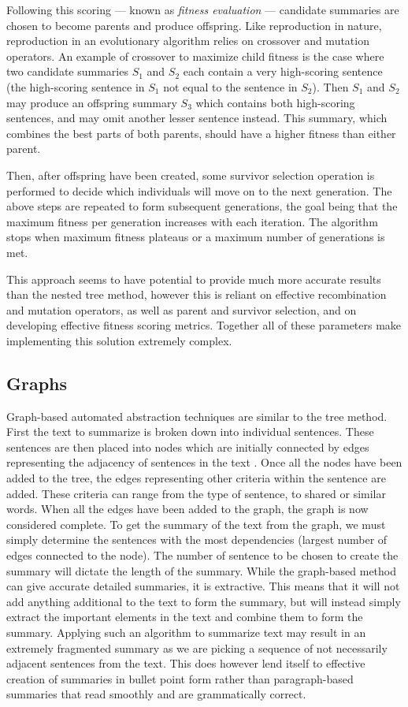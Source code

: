 Following this scoring --- known as {\em fitness evaluation} --- candidate summaries are chosen to become parents and produce offspring. Like reproduction in nature, reproduction in an evolutionary algorithm relies on crossover and mutation operators. An example of crossover to maximize child fitness is the case where two candidate summaries $S_1$ and $S_2$ each contain a very high-scoring sentence (the high-scoring sentence in $S_1$ not equal to the sentence in $S_2$). Then $S_1$ and $S_2$ may produce an offspring summary $S_3$ which contains both high-scoring sentences, and may omit another lesser sentence instead. This summary, which combines the best parts of both parents, should have a higher fitness than either parent.

Then, after offspring have been created, some survivor selection operation is performed to decide which individuals will move on to the next generation. The above steps are repeated to form subsequent generations, the goal being that the maximum fitness per generation increases with each iteration. The algorithm stops when maximum fitness plateaus or a maximum number of generations is met.

This approach seems to have potential to provide much more accurate results than the nested tree method, however this is reliant on effective recombination and mutation operators, as well as parent and survivor selection, and on developing effective fitness scoring metrics. Together all of these parameters make implementing this solution extremely complex.


\subsection{Graphs}
Graph-based automated abstraction techniques are similar to the tree method. First the text to summarize is broken down into individual sentences. These sentences are then placed into nodes which are initially connected by edges representing the adjacency of sentences in the text \cite{art4}. Once all the nodes have been added to the tree, the edges representing other criteria within the sentence are added. These criteria can range from the type of sentence, to shared or similar words. When all the edges have been added to the graph, the graph is now considered complete. To get the summary of the text from the graph, we must simply determine the sentences with the most dependencies (\ie largest number of edges connected to the node). The number of sentence to be chosen to create the summary will dictate the length of the summary. While the graph-based method can give accurate detailed summaries, it is extractive. This means that it will not add anything additional to the text to form the summary, but will instead simply extract the important elements in the text and combine them to form the summary.
Applying such an algorithm to summarize text may result in an extremely fragmented summary as we are picking a sequence of not necessarily adjacent sentences from the text. This does however lend itself to effective creation of summaries in bullet point form rather than paragraph-based summaries that read smoothly and are grammatically correct.
